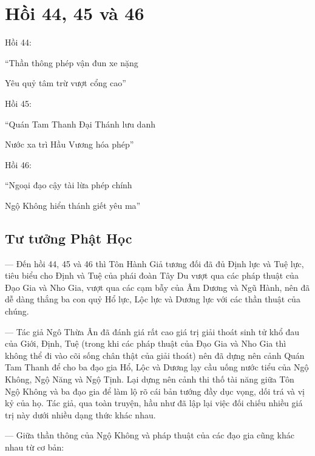 \chapter{Hồi 44, 45 và 46} %
\label{cha:hoi_44_45}

Hồi 44:

\begin{itshape}
``Thần thông phép vận đun xe nặng

Yêu quỷ tâm trừ vượt cổng cao''
\end{itshape}

Hồi 45:

\begin{itshape}
``Quán Tam Thanh Đại Thánh lưu danh

Nước xa trì Hầu Vương hóa phép''
\end{itshape}

Hồi 46:

\begin{itshape}
``Ngoại đạo cậy tài lừa phép chính

Ngộ Không hiển thánh giết yêu ma''
\end{itshape}

\section{Tư tưởng Phật Học} %
\label{sec:44_45_phat_hoc}

— Đến hồi 44, 45 và 46 thì Tôn Hành Giả tương đối đã đủ Định lực và Tuệ lực, tiêu biểu cho Định và Tuệ của phái đoàn Tây Du vượt qua các pháp thuật của Đạo Gia và Nho Gia, vượt qua các cạm bẫy của Âm Dương và Ngũ Hành, nên đã dễ dàng thắng ba con quỷ Hổ lực, Lộc lực và Dương lực với các thần thuật của chúng.

— Tác giả Ngô Thừa Ân đã đánh giá rất cao giá trị giải thoát sinh tử khổ đau của Giới, Định, Tuệ (trong khi các pháp thuật của Đạo Gia và Nho Gia thì không thể đi vào cõi sống chân thật của giải thoát) nên đã dựng nên cảnh Quán Tam Thanh để cho ba đạo gia Hổ, Lộc và Dương lạy cầu uống nước tiểu của Ngộ Không, Ngộ Năng và Ngộ Tịnh. Lại dựng nên cảnh thi thố tài năng giữa Tôn Ngộ Không và ba đạo gia để làm lộ rõ cái bản tướng đầy dục vọng, dối trá và vị kỷ của họ. Tác giả, qua toàn truyện, hầu như đã lập lại việc đối chiếu nhiều giá trị này dưới nhiều dạng thức khác nhau.

— Giữa thần thông của Ngộ Không và pháp thuật của các đạo gia cũng khác nhau từ cơ bản:

